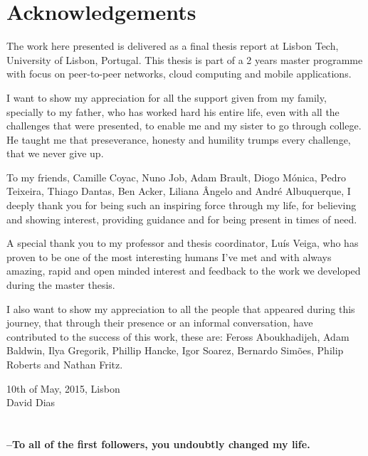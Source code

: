 \chapter*{Acknowledgements}
\thispagestyle{empty}

The work here presented is delivered as a final thesis report at Lisbon Tech, University of Lisbon, Portugal. This thesis is part of a 2 years master programme with focus on peer-to-peer networks, cloud computing and mobile applications.

I want to show my appreciation for all the support given from my family, specially to my father, who has worked hard his entire life, even with all the challenges that were presented, to enable me and my sister to go through college. He taught me that preseverance, honesty and humility trumps every challenge, that we never give up.

To my friends, Camille Coyac, Nuno Job, Adam Brault, Diogo Mónica, Pedro Teixeira,  Thiago Dantas, Ben Acker, Liliana Ângelo and André Albuquerque, I deeply thank you for being such an inspiring force through my life, for believing and showing interest, providing guidance and for being present in times of need.

A special thank you to my professor and thesis coordinator, Luís Veiga, who has proven to be one of the most interesting humans I've met and with always amazing, rapid and open minded interest and feedback to the work we developed during the master thesis.

I also want to show my appreciation to all the people that appeared during this journey, that through their presence or an informal conversation, have contributed to the success of this work, these are: Feross Aboukhadijeh, Adam Baldwin, Ilya Gregorik, Phillip Hancke, Igor Soarez, Bernardo Simões, Philip Roberts and Nathan Fritz.

\vspace{15pt}
\vfill
\begin{flushright}
    \begin{minipage}{8cm}
        \begin{center}
            10th of May, 2015, Lisbon \\ 
            David Dias
        \end{center}
    \end{minipage}
\end{flushright}

\cleardoublepage

\chapter*{}
\thispagestyle{empty}
\vfill
\vfill
\begin{flushright}
    \begin{minipage}{8cm}
        \begin{center}
            {\Large\bf --To all of the first followers, you undoubtly changed my life.}

        \end{center}
    \end{minipage}
\end{flushright}

\cleardoublepage
